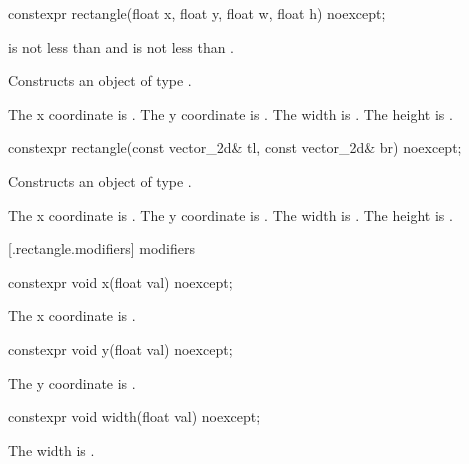 %
\begin{itemdecl}
constexpr rectangle(float x, float y, float w, float h) noexcept;
\end{itemdecl}
\begin{itemdescr}
\pnum
\requires
{} is not less than  and  is not less than .

\pnum
\effects
Constructs an object of type .

\pnum
The x coordinate is . The y coordinate is . The width is . The height is .
\end{itemdescr}

%
\begin{itemdecl}
constexpr rectangle(const vector_2d& tl, const vector_2d& br) noexcept;
\end{itemdecl}
\begin{itemdescr}
\pnum
\effects
Constructs an object of type .

\pnum
The x coordinate is . The y coordinate is . The width is . The height is .
\end{itemdescr}

 [\iotwod.rectangle.modifiers]{ modifiers}

%
\begin{itemdecl}
constexpr void x(float val) noexcept;
\end{itemdecl}

\begin{itemdescr}
\pnum
\effects
The x coordinate is .
\end{itemdescr}

%
\begin{itemdecl}
constexpr void y(float val) noexcept;
\end{itemdecl}
\begin{itemdescr}
\pnum
\effects
The y coordinate is .
\end{itemdescr}

%
\begin{itemdecl}
constexpr void width(float val) noexcept;
\end{itemdecl}
\begin{itemdescr}
\pnum
\effects
The width is .
\end{itemdescr}

